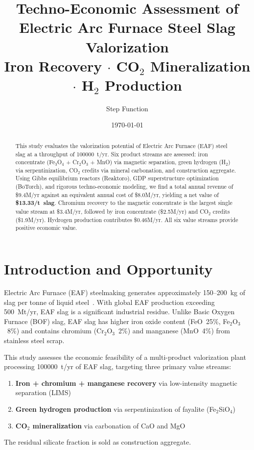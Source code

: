 \documentclass[11pt,a4paper]{article}
\title{Techno-Economic Assessment of\\Electric Arc Furnace Steel Slag Valorization\\[8pt]
\large Iron Recovery $\cdot$ CO$_2$ Mineralization $\cdot$ H$_2$ Production}
\author{Step Function}
\date{\today}
\begin{document}
\maketitle

\begin{abstract}
This study evaluates the valorization potential of Electric Arc Furnace (EAF) steel slag
at a throughput of \num{100000}~t/yr. Six product streams are assessed:
iron concentrate (Fe$_3$O$_4$ + Cr$_2$O$_3$ + MnO) via magnetic separation,
green hydrogen (H$_2$) via serpentinization, CO$_2$ credits via mineral carbonation,
and construction aggregate.
Using Gibbs equilibrium reactors (Reaktoro), GDP superstructure optimization (BoTorch),
and rigorous techno-economic modeling, we find a total annual revenue of
\$\num{9.4}M/yr against an equivalent annual cost of \$\num{8.0}M/yr,
yielding a net value of \textbf{\$13.33/t~slag}.
Chromium recovery to the magnetic concentrate is the largest single value stream
at \$\num{3.4}M/yr, followed by iron concentrate (\$\num{2.5}M/yr) and
CO$_2$ credits (\$\num{1.9}M/yr). Hydrogen production contributes \$\num{0.46}M/yr.
All six value streams provide positive economic value.
\end{abstract}

\tableofcontents
\newpage

\section{Introduction and Opportunity}

Electric Arc Furnace (EAF) steelmaking generates approximately 150--200~kg of slag
per tonne of liquid steel~\cite{worldsteel2023}. With global EAF production exceeding
500~Mt/yr, EAF slag is a significant industrial residue. Unlike Basic Oxygen Furnace
(BOF) slag, EAF slag has higher iron oxide content (FeO~25\%, Fe$_2$O$_3$~8\%) and
contains chromium (Cr$_2$O$_3$~2\%) and manganese (MnO~4\%) from stainless steel scrap.

This study assesses the economic feasibility of a multi-product valorization plant
processing \num{100000}~t/yr of EAF slag, targeting three primary value streams:
\begin{enumerate}[nosep]
  \item \textbf{Iron + chromium + manganese recovery} via low-intensity magnetic separation (LIMS)
  \item \textbf{Green hydrogen production} via serpentinization of fayalite (Fe$_2$SiO$_4$)
  \item \textbf{CO$_2$ mineralization} via carbonation of CaO and MgO
\end{enumerate}
The residual silicate fraction is sold as construction aggregate.
\end{document}

